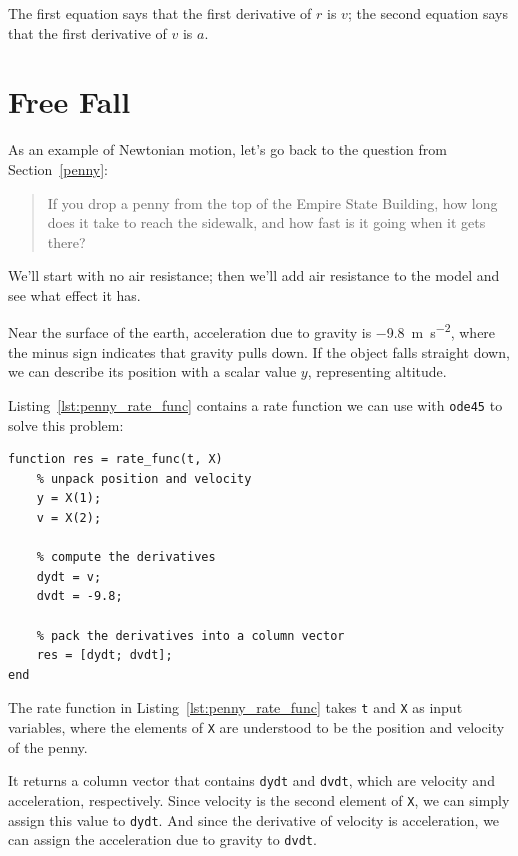 The first equation says that the first derivative of $r$ is $v$;
the second equation says that the first derivative of $v$ is $a$.


\section{Free Fall}
\label{freefall}

As an example of Newtonian motion, let's go back to the question from Section~\ref{penny}:

\begin{quote}
If you drop a penny from the top of the Empire State Building, how long does it take to reach the sidewalk, and how fast is it going when it gets there?
\end{quote}

We'll start with no air resistance; then we'll add air resistance to the model and see what effect it has.


Near the surface of the earth,
acceleration due to gravity is \SI{-9.8}{\meter \per \second \squared}, where the minus sign
indicates that gravity pulls down.
If the object falls straight down, we can describe its position with a
scalar value $y$, representing altitude.

Listing~\ref{lst:penny_rate_func} contains a rate function we can use with \lstinline{ode45} to solve
this problem:

\begin{lstlisting}[caption={A rate function for the falling penny problem}, label={lst:penny_rate_func}]
function res = rate_func(t, X)
    % unpack position and velocity
    y = X(1);      
    v = X(2);      
    
    % compute the derivatives
    dydt = v;
    dvdt = -9.8;

    % pack the derivatives into a column vector
    res = [dydt; dvdt];
end
\end{lstlisting}

The rate function in Listing~\ref{lst:penny_rate_func} takes \lstinline{t} and \lstinline{X} as input variables, where the elements of \lstinline{X} are understood to be the position and velocity of the penny.

It returns a column vector that contains \lstinline{dydt} and \lstinline{dvdt}, which
are velocity and acceleration, respectively.
Since velocity is the second element of \lstinline{X}, we can simply assign this value to \lstinline{dydt}.
And since the derivative of velocity is acceleration, we can assign the acceleration due to gravity to \lstinline{dvdt}.

